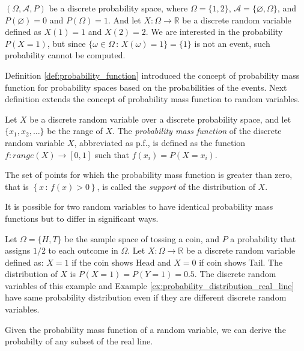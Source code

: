 \begin{example}
$\left( \Omega, \mathcal{A} , P \right)$ be a discrete probability space, where $\Omega = \{1, 2\}$, $\mathcal{A} = \{\varnothing, \Omega\}$, and $P(\varnothing)=0$ and $P(\Omega)=1$. And let $X : \Omega \rightarrow \mathbb{R}$ be a discrete random variable defined as $X(1) = 1$ and $X(2) = 2$. We are interested in the probability $P(X=1)$, but since $\{ \omega \in \Omega \,:\, X \left( \omega \right) = 1 \} = \{1\}$ is not an event, such probability cannot be computed.
\end{example}

Definition \ref{def:probability_function} introduced the concept of probability mass function for probability spaces based on the probabilities of the events. Next definition extends the concept of probability mass function to random variables.

\begin{definition}
Let $X$ be a discrete random variable over a discrete probability space, and let $\{ x_1, x_2, \ldots \}$ be the range of $X$. The \emph{probability mass function} of the discrete random variable $X$, abbreviated as p.f., is defined as the function $f : range \left( X \right) \rightarrow [0, 1]$ such that $f \left( x_i \right) = P \left( X = x_i \right)$.
\end{definition}

The set of points for which the probability mass function is greater than zero, that is $\left\{ x \, : \, f \left( x \right) > 0 \right\}$, is called the \emph{support} of the distribution of $X$.

It is possible for two random variables to have identical probability mass functions but to differ in significant ways.

\begin{example}
Let $\Omega = \{H, T\}$ be the sample space of tossing a coin, and $P$ a probability that assigns $1/2$ to each outcome in $\Omega$. Let $X: \Omega \rightarrow \mathbb{R}$ be a discrete random variable defined as: $X = 1$ if the coin shows Head and $X = 0$ if coin shows Tail. The distribution of $X$ is $P(X = 1) = P(Y = 1) = 0.5$. The discrete random variables of this example and Example \ref{ex:probability_distribution_real_line} have same probability distribution even if they are different discrete random variables.
\end{example}

Given the probability mass function of a random variable, we can derive the probabilty of any subset of the real line.

